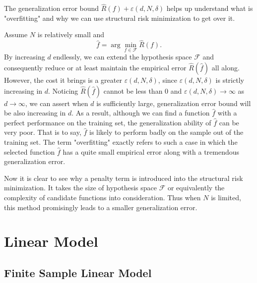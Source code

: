 \documentclass{report}
\theoremstyle{nonumberplain}
\newcommand{\0}{\mathbf{0}}
\begin{document}
The generalization error bound $\hat{R}(f)+\varepsilon(d, N, \delta)$ helps up understand what is "overfitting" and why we can use structural risk minimization to get over it. 

Assume $N$ is relatively small and
\[
\hat{f}=\arg\min_{f\in\mathcal{F}}\hat{R}(f).
\] By increasing $d$ endlessly, we can extend the hypothesis space $\mathcal{F}$ and consequently reduce or at least maintain the empirical error $\hat{R}(\hat{f})$ all along. However, the cost it brings is a greater $\varepsilon(d, N, \delta)$, since $\varepsilon(d, N, \delta)$ is strictly increasing in $d$. Noticing $\hat{R}(\hat{f})$ cannot be less than 0 and $\varepsilon(d, N, \delta)\to\infty$ as $d\to\infty$, we can assert when $d$ is sufficiently large, generalization error bound will be also increasing in $d$. As a result, although we can find a function $\hat{f}$ with a perfect performance on the training set, the generalization ability of $\hat{f}$ can be very poor. That is to say, $\hat{f}$ is likely to perform badly on the sample out of the training set. The term "overfitting" exactly refers to such a case in which the selected function $\hat{f}$ has a quite small empirical error along with a tremendous generalization error. 

Now it is clear to see why a penalty term is introduced into the structural risk minimization. It takes the size of hypothesis space $\mathcal{F}$ or equivalently the complexity of candidate functions into consideration. Thus when $N$ is limited, this method promisingly leads to a smaller generalization error.






\chapter{Linear Model}
\section{Finite Sample Linear Model}
\end{document}

